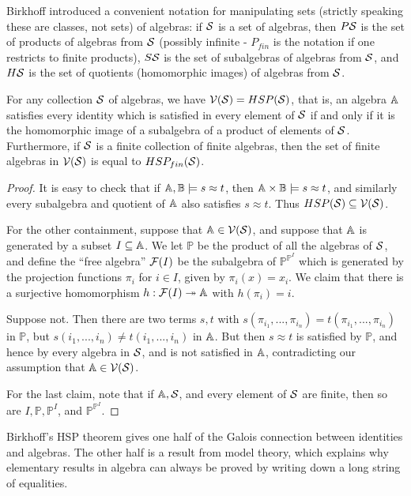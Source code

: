\documentclass[letterpaper,11pt]{article}
\begin{document}
Birkhoff \cite{birkhoff} introduced a convenient notation for manipulating sets (strictly speaking these are classes, not sets) of algebras: if $\mathcal{S}$ is a set of algebras, then $P\mathcal{S}$ is the set of products of algebras from $\mathcal{S}$ (possibly infinite - $P_{fin}$ is the notation if one restricts to finite products), $S\mathcal{S}$ is the set of subalgebras of algebras from $\mathcal{S}$, and $H\mathcal{S}$ is the set of quotients (homomorphic images) of algebras from $\mathcal{S}$.

\begin{thm} For any collection $\mathcal{S}$ of algebras, we have $\mathcal{V}(\mathcal{S}) = HSP(\mathcal{S})$, that is, an algebra $\mathbb{A}$ satisfies every identity which is satisfied in every element of $\mathcal{S}$ if and only if it is the homomorphic image of a subalgebra of a product of elements of $\mathcal{S}$. Furthermore, if $\mathcal{S}$ is a finite collection of finite algebras, then the set of finite algebras in $\mathcal{V}(\mathcal{S})$ is equal to $HSP_{fin}(\mathcal{S})$.
\end{thm}
\begin{proof} It is easy to check that if $\mathbb{A}, \mathbb{B} \models s \approx t$, then $\mathbb{A} \times \mathbb{B} \models s \approx t$, and similarly every subalgebra and quotient of $\mathbb{A}$ also satisfies $s \approx t$. Thus $HSP(\mathcal{S}) \subseteq \mathcal{V}(\mathcal{S})$.

For the other containment, suppose that $\mathbb{A} \in \mathcal{V}(\mathcal{S})$, and suppose that $\mathbb{A}$ is generated by a subset $I \subseteq \mathbb{A}$. We let $\mathbb{P}$ be the product of all the algebras of $\mathcal{S}$, and define the ``free algebra'' $\mathcal{F}(I)$ be the subalgebra of $\mathbb{P}^{\mathbb{P}^I}$ which is generated by the projection functions $\pi_i$ for $i \in I$, given by $\pi_i(x) = x_i$. We claim that there is a surjective homomorphism $h : \mathcal{F}(I) \twoheadrightarrow \mathbb{A}$ with $h(\pi_i) = i$.

Suppose not. Then there are two terms $s,t$ with $s(\pi_{i_1}, ..., \pi_{i_n}) = t(\pi_{i_1}, ..., \pi_{i_n})$ in $\mathbb{P}$, but $s(i_1, ..., i_n) \ne t(i_1, ..., i_n)$ in $\mathbb{A}$. But then $s \approx t$ is satisfied by $\mathbb{P}$, and hence by every algebra in $\mathcal{S}$, and is not satisfied in $\mathbb{A}$, contradicting our assumption that $\mathbb{A} \in \mathcal{V}(\mathcal{S})$.

For the last claim, note that if $\mathbb{A}, \mathcal{S}$, and every element of $\mathcal{S}$ are finite, then so are $I, \mathbb{P}, \mathbb{P}^I$, and $\mathbb{P}^{\mathbb{P}^I}$.
\end{proof}

Birkhoff's HSP theorem gives one half of the Galois connection between identities and algebras. The other half is a result from model theory, which explains why elementary results in algebra can always be proved by writing down a long string of equalities.
\end{document}
